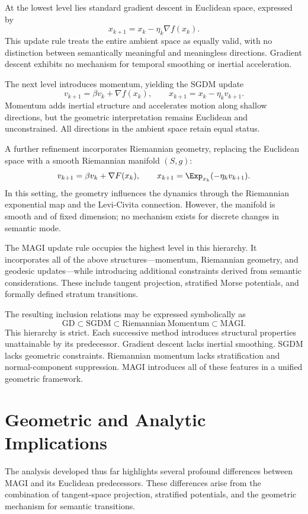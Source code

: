 \documentclass[12pt]{article}
\begin{document}
At the lowest level lies standard gradient descent in Euclidean space, expressed by
\[
x_{k+1} = x_k - \eta_k \nabla f(x_k).
\]
This update rule treats the entire ambient space as equally valid, with no distinction between semantically meaningful and meaningless directions. Gradient descent exhibits no mechanism for temporal smoothing or inertial acceleration.

The next level introduces momentum, yielding the SGDM update
\[
v_{k+1} = \beta v_k + \nabla f(x_k),
\qquad
x_{k+1} = x_k - \eta_k v_{k+1}.
\]
Momentum adds inertial structure and accelerates motion along shallow directions, but the geometric interpretation remains Euclidean and unconstrained. All directions in the ambient space retain equal status.

A further refinement incorporates Riemannian geometry, replacing the Euclidean space with a smooth Riemannian manifold $(S,g)$:
\[
v_{k+1} = \beta v_k + \nabla F(x_k),
\qquad
x_{k+1} = \Exp_{x_k}(-\eta_k v_{k+1}).
\]
In this setting, the geometry influences the dynamics through the Riemannian exponential map and the Levi-Civita connection. However, the manifold is smooth and of fixed dimension; no mechanism exists for discrete changes in semantic mode.

The MAGI update rule occupies the highest level in this hierarchy. It incorporates all of the above structures—momentum, Riemannian geometry, and geodesic updates—while introducing additional constraints derived from semantic considerations. These include tangent projection, stratified Morse potentials, and formally defined stratum transitions.

The resulting inclusion relations may be expressed symbolically as
\[
\mathrm{GD}
\subset
\mathrm{SGDM}
\subset
\mathrm{Riemannian\ Momentum}
\subset
\mathrm{MAGI}.
\]
This hierarchy is strict. Each successive method introduces structural properties unattainable by its predecessor. Gradient descent lacks inertial smoothing. SGDM lacks geometric constraints. Riemannian momentum lacks stratification and normal-component suppression. MAGI introduces all of these features in a unified geometric framework.


\section{Geometric and Analytic Implications}

The analysis developed thus far highlights several profound differences between MAGI and its Euclidean predecessors. These differences arise from the combination of tangent-space projection, stratified potentials, and the geometric mechanism for semantic transitions.
\end{document}
